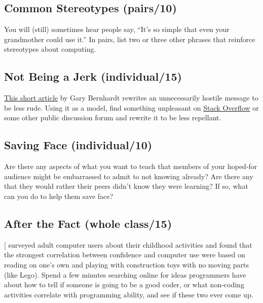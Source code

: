 \subsection{Common Stereotypes (pairs/10)}\label{common-stereotypes-pairs10}

You will (still) sometimes hear people say, ``It's so simple that even
your grandmother could use it.'' In pairs, list two or three other
phrases that reinforce stereotypes about computing.

\subsection{Not Being a Jerk (individual/15)}\label{not-being-a-jerk-individual15}

\href{https://www.destroyallsoftware.com/blog/2018/a-case-study-in-not-being-a-jerk-in-open-source}{This short article} by Gary Bernhardt rewrites an
unnecessarily hostile message to be less rude. Using it as a model,
find something unpleasant on \href{https://stackoverflow.com/}{Stack Overflow} or some
other public discussion forum and rewrite it to be less repellant.

\subsection{Saving Face (individual/10)}\label{saving-face-individual10}

Are there any aspects of what you want to teach that members of your
hoped-for audience might be embarrassed to admit to not knowing already?
Are there any that they would rather their peers didn't know they were
learning? If so, what can you do to help them save face?

\subsection{After the Fact (whole class/15)}\label{after-the-fact-whole-class15}

{[}\protect[\hyperlink{b:Cutt2017}{Cutt2017}]{]} surveyed adult computer users about their childhood
activities and found that the strongest correlation between confidence
and computer use were based on reading on one's own and playing with
construction toys with no moving parts (like Lego). Spend a few minutes
searching online for ideas programmers have about how to tell if someone
is going to be a good coder, or what non-coding activities correlate
with programming ability, and see if these two ever come up.

